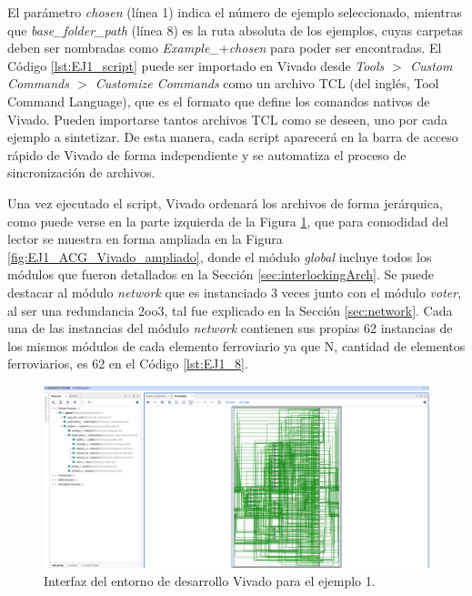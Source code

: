 	El parámetro \textit{chosen} (línea 1) indica el número de ejemplo seleccionado, mientras que \textit{base\_folder\_path} (línea 8) es la ruta absoluta de los ejemplos, cuyas carpetas deben ser nombradas como \textit{Example\_}+\textit{chosen} para poder ser encontradas. El Código \ref{lst:EJ1_script} puede ser importado en Vivado desde \textit{Tools $>$ Custom Commands $>$ Customize Commands} como un archivo TCL (del inglés, Tool Command Language), que es el formato que define los comandos nativos de Vivado. Pueden importarse tantos archivos TCL como se deseen, uno por cada ejemplo a sintetizar. De esta manera, cada script aparecerá en la barra de acceso rápido de Vivado de forma independiente y se automatiza el proceso de sincronización de archivos.
	
	Una vez ejecutado el script, Vivado ordenará los archivos de forma jerárquica, como puede verse en la parte izquierda de la Figura \ref{fig:EJ1_ACG_Vivado}, que para comodidad del lector se muestra en forma ampliada en la Figura \ref{fig:EJ1_ACG_Vivado_ampliado}, donde el módulo \textit{global} incluye todos los módulos que fueron detallados en la Sección \ref{sec:interlockingArch}. Se puede destacar al módulo \textit{network} que es instanciado 3 veces junto con el módulo \textit{voter}, al ser una redundancia 2oo3, tal fue explicado en la Sección \ref{sec:network}. Cada una de las instancias del módulo \textit{network} contienen sus propias 62 instancias de los mismos módulos de cada elemento ferroviario ya que N, cantidad de elementos ferroviarios, es 62 en el Código \ref{lst:EJ1_8}.	
	
	\begin{figure}[H]
		\centering
		\includegraphics[origin = c, width=1\textwidth]{resultados-obtenidos/ejemplo1/images/ACG_vivado}
		\centering\caption{Interfaz del entorno de desarrollo Vivado para el ejemplo 1.}
		\label{fig:EJ1_ACG_Vivado}
	\end{figure}
	
